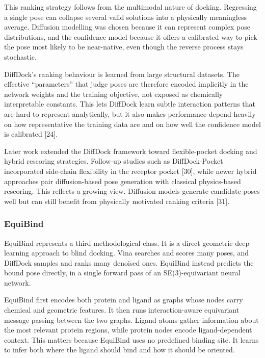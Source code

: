 This ranking strategy follows from the multimodal nature of docking. Regressing a single pose can collapse several valid solutions into a physically meaningless average. Diffusion modelling was chosen because it can represent complex pose distributions, and the confidence model because it offers a calibrated way to pick the pose most likely to be near-native, even though the reverse process stays stochastic.

DiffDock's ranking behaviour is learned from large structural datasets. The effective ``parameters'' that judge poses are therefore encoded implicitly in the network weights and the training objective, not exposed as chemically interpretable constants. This lets DiffDock learn subtle interaction patterns that are hard to represent analytically, but it also makes performance depend heavily on how representative the training data are and on how well the confidence model is calibrated {[}24{]}.

Later work extended the DiffDock framework toward flexible-pocket docking and hybrid rescoring strategies. Follow-up studies such as DiffDock-Pocket incorporated side-chain flexibility in the receptor pocket {[}30{]}, while newer hybrid approaches pair diffusion-based pose generation with classical physics-based rescoring. This reflects a growing view. Diffusion models generate candidate poses well but can still benefit from physically motivated ranking criteria {[}31{]}.

\hypertarget{equibind-1}{%
\subsubsection{EquiBind}\label{equibind-1}}

EquiBind represents a third methodological class. It is a direct geometric deep-learning approach to blind docking. Vina searches and scores many poses, and DiffDock samples and ranks many denoised ones. EquiBind instead predicts the bound pose directly, in a single forward pass of an SE(3)-equivariant neural network.

EquiBind first encodes both protein and ligand as graphs whose nodes carry chemical and geometric features. It then runs interaction-aware equivariant message passing between the two graphs. Ligand atoms gather information about the most relevant protein regions, while protein nodes encode ligand-dependent context. This matters because EquiBind uses no predefined binding site. It learns to infer both where the ligand should bind and how it should be oriented.

